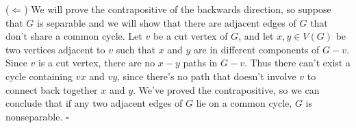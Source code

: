 \documentclass[letterpaper, reqno,11pt]{article}
\begin{document}
($\Leftarrow$) We will prove the contrapositive of the backwards direction, so suppose that $G$ is separable and we will show that there are adjacent edges of $G$ that don't share a common cycle. Let $v$ be a cut vertex of $G$, and let $x,y\in V(G)$ be two vertices adjacent to $v$ such that $x$ and $y$ are in different components of $G-v$. Since $v$ is a cut vertex, there are no $x-y$ paths in $G-v$. Thus there can't exist a cycle containing $vx$ and $vy$, since there's no path that doesn't involve $v$ to connect back together $x$ and $y$. We've proved the contrapositive, so we can conclude that if any two adjacent edges of $G$ lie on a common cycle, $G$ is nonseparable. $\square$
\end{document}

